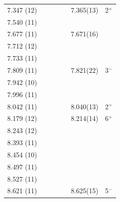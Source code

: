 \begin{center}
\begin{longtable}{cc c cc cc}
  7.347 (12)    &       &                   &                   &                   &    7.365(13)      &  2$^+$            \\
  7.540 (11)    &       &                   &                   &                   &                   &                   \\
  7.677 (11)    &       &                   &                   &                   &    7.671(16)      &                   \\
  7.712 (12)    &       &                   &                   &                   &                   &                   \\
  7.733 (11)    &       &                   &                   &                   &                   &                   \\
  7.809 (11)    &       &                   &                   &                   &    7.821(22)      &  3$^-$            \\
  7.942 (10)    &       &                   &                   &                   &                   &                   \\
  7.996 (11)    &       &                   &                   &                   &                   &                   \\
  8.042 (11)    &       &                   &                   &                   &    8.040(13)      &   2$^+$           \\
  8.179 (12)    &       &                   &                   &                   &    8.214(14)      &   6$^+$           \\
  8.243 (12)    &       &                   &                   &                   &                   &                   \\
  8.393 (11)    &       &                   &                   &                   &                   &                   \\
  8.454 (10)    &       &                   &                   &                   &                   &                   \\
  8.497 (11)    &       &                   &                   &                   &                   &                   \\
  8.527 (11)    &       &                   &                   &                   &                   &                   \\
  8.621 (11)    &       &                   &                   &                   &    8.625(15)      &   5$^-$           \\

\end{longtable}
\end{center}

